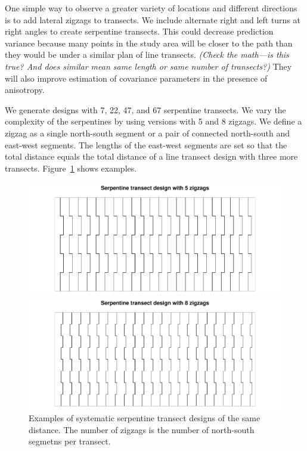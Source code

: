 \documentclass[review]{elsarticle}
\begin{document}
One simple way to observe a greater variety of locations and different
directions is to add lateral zigzags to transects. We include alternate right
and left turns at right angles to create serpentine transects. This could
decrease prediction variance because many points in the study area will be
closer to the path than they would be under a similar plan of line transects.
{\it (Check the math---is this true? And does similar mean same length or same
number of transects?)} They will also improve estimation of covariance
parameters in the presence of anisotropy.

We generate designs with 7, 22, 47, and 67 serpentine transects. We vary the
complexity of the serpentines by using versions with 5 and 8 zigzags. We define
a zigzag as a single north-south segment or a pair of connected north-south and
east-west segments. The lengths of the east-west segments are set so that the
total distance equals the total distance of a line transect design with
three more transects. Figure~\ref{serps} shows examples.


\begin{figure}
\includegraphics[width=5in]{Serp000124.pdf}

\includegraphics[width=5in]{Serp000539.pdf}

\caption{Examples of systematic serpentine transect designs of the same
distance. The number of zigzags is the number of north-south segmetns per
transect.}
\label{serps}
\end{figure}
\end{document}

